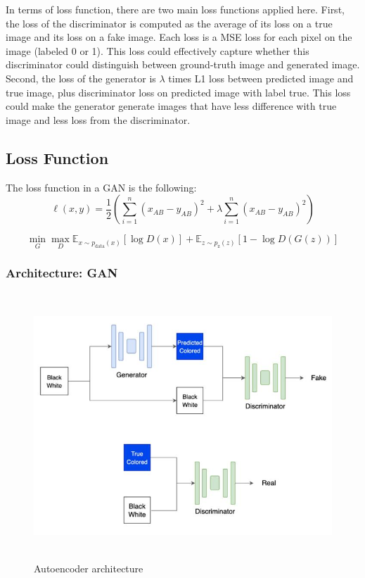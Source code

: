 \documentclass{article}
\begin{document}
In terms of loss function, there are two main loss functions applied here. 
First, the loss of the discriminator is computed as the average of its loss on a true image and its loss on a fake image. 
Each loss is a MSE loss for each pixel on the image (labeled 0 or 1). 
This loss could effectively capture whether this discriminator could distinguish between ground-truth image and generated image.
Second, the loss of the generator is $\lambda$ times L1 loss between predicted image and true image, plus discriminator loss on predicted image with label true.
This loss could make the generator generate images that have less difference with true image and less loss from the discriminator.

\subsection{Loss Function}
The loss function in a GAN is the following:
{\Large
\begin{equation}
    \ell(x,y) = \frac{1}{2} \left( \sum_{i=1}^{n} \left( x_{AB} - y_{AB} \right)^2 + \lambda \sum_{i=1}^{n} \left( x_{AB} - y_{AB} \right)^2 \right)
\end{equation}
}

{\Large
\begin{equation}
\min_{G}\max_{D}\mathbb{E}_{x\sim p_{\text{data}}(x)}[\log{D(x)}] +  \mathbb{E}_{z\sim p_{\text{z}}(z)}[1 - \log{D(G(z))}]
\end{equation}
}

\subsubsection{Architecture: GAN}

\begin{figure}[htbp!]
    \centering
        \includegraphics[width=15cm, height=10cm]{gan.jpg}
        \caption{Autoencoder architecture}
    \end{figure}
\end{document}
